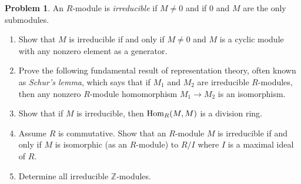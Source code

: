 \documentclass[letterpaper,11pt]{amsart}
\theoremstyle{plain}
\theoremstyle{definition}
\newtheorem{pr}{Problem}
\theoremstyle{remark}
\begin{document}
\begin{pr}
    An $R$-module is \emph{irreducible} if $M \neq 0$ and if $0$ and $M$ are the only submodules.
    \begin{enumerate}
        \item Show that $M$ is irreducible if and only if $M \neq 0$ and $M$ is a cyclic module with any nonzero element as a generator.
        \item Prove the following fundamental result of representation theory, often known as \emph{Schur's lemma}, which says that if $M_1$ and $M_2$ are irreducible $R$-modules, then any nonzero $R$-module homomorphism $M_1\rightarrow M_2$ is an isomorphism.
        \item Show that if $M$ is irreducible, then ${\rm Hom}_R(M,M)$ is a division ring.
        \item Assume $R$ is commutative. Show that an $R$-module $M$ is irreducible if and only if $M$ is isomorphic (as an $R$-module) to $R/I$ where $I$ is a maximal ideal of $R$.
        \item Determine all irreducible $\mathbb{Z}$-modules.
    \end{enumerate}
\end{pr}
\end{document}
